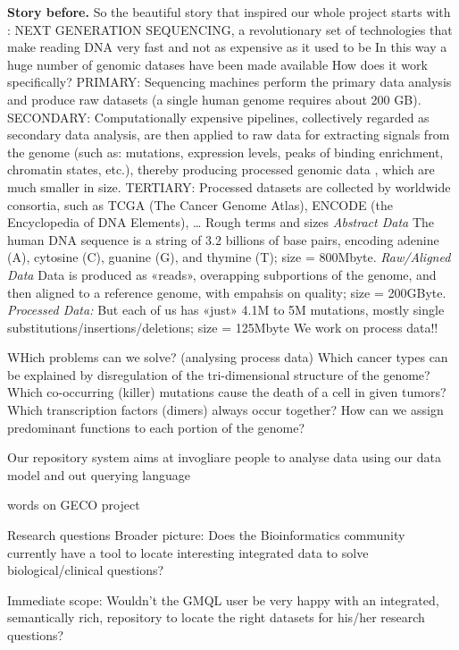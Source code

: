 \documentclass[conference]{IEEEtran}
\begin{document}
\textbf{Story before.}
So the beautiful story that inspired our whole project starts with :
NEXT GENERATION SEQUENCING, a revolutionary set of technologies that make reading DNA very fast and not as expensive as it used to be In this way a huge number of genomic datases have been made available
How does it work specifically?
PRIMARY: Sequencing machines perform the primary data analysis  and produce raw datasets (a single human genome requires about 200 GB). 
SECONDARY: Computationally expensive pipelines, collectively regarded as secondary data analysis, are then applied to raw data for extracting signals from the genome (such as: mutations,
expression levels, peaks of binding enrichment, chromatin states, etc.), thereby producing processed genomic data , which are much smaller in size.
TERTIARY: Processed datasets are collected by worldwide consortia, such as TCGA (The Cancer Genome Atlas), ENCODE (the Encyclopedia of DNA Elements), …
Rough terms and sizes
\textit{Abstract Data}
The human DNA sequence is a string of 3.2 billions of base pairs, encoding adenine (A), cytosine (C), guanine (G), and thymine (T); size = 800Mbyte.
\textit{Raw/Aligned Data} 
Data is produced as «reads», overapping subportions of the genome, and then aligned to a reference genome, with empahsis on quality; size = 200GByte. 
\textit{Processed Data:}
But each of us has «just» 4.1M to 5M mutations, mostly single substitutions/insertions/deletions; size = 125Mbyte
We work on process data!!

WHich problems can we solve? (analysing process data)
Which cancer types can be explained by disregulation of the tri-dimensional structure of the genome?
Which co-occurring (killer) mutations cause the death of a cell in given tumors?
Which transcription factors (dimers) always occur together?
How can we assign predominant functions to each portion of the genome?

Our repository system aims at invogliare people to analyse data using our data model and out querying language

words on GECO project





Research questions
Broader picture: Does the Bioinformatics community currently have a tool to locate 
interesting integrated data 
to solve biological/clinical questions?

Immediate scope: Wouldn’t the GMQL user be very happy with an integrated, semantically rich, repository to locate the right datasets 
for his/her research questions?
\end{document}
